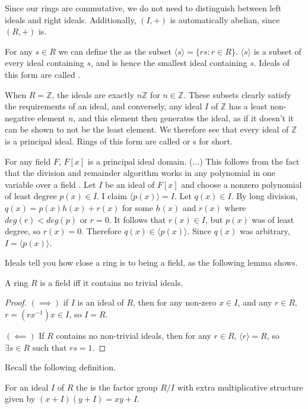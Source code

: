 \begin{remark}
Since our rings are commutative, we do not need to distinguish between left ideals and right ideals. Additionally, $(I,+)$ is automatically abelian, since $(R,+)$ is.
\end{remark}

\begin{example}
For any $s\in R$ we can define the  as the subset $\langle s\rangle =\{rs:r\in R\}$. $\langle s\rangle$ is a subset of every ideal containing $s$, and is hence the smallest ideal containing $s$. Ideals of this form are called .
\end{example}
\begin{example}
When $R=\mathbb{Z}$, the ideals are exactly $n\mathbb{Z}$ for $n\in \mathbb{Z}$. These subsets clearly satisfy the requirements of an ideal, and conversely, any ideal $I$ of $\mathbb{Z}$ has a least non-negative element $n$, and this element then generates the ideal, as if it doesn't it can be shown to not be the least element. We therefore see that every ideal of $\mathbb{Z}$ is a principal ideal. Rings of this form are called  or s for short.
\end{example}
\begin{example}\label{F[x]-PID}
For any field $F$, $F[x]$ is a principal ideal domain. (...) This follows from the fact that the division and remainder algorithm works in any polynomial in one variable over a field \cite{Honours-Algebra}. Let $I$ be an ideal of $F[x]$ and choose a nonzero polynomial of least degree $p(x)\in I$. I claim $\langle p(x)\rangle =I$. Let $q(x)\in I$. By long division, $q(x)=p(x)h(x)+r(x)$ for some $h(x)$ and $r(x)$ where $deg(r)<deg(p)$ or $r=0$. It follows that $r(x)\in I$, but $p(x)$ was of least degree, so $r(x)=0$. Therefore $q(x)\in \langle p(x)\rangle$. Since $q(x)$ was arbitrary, $I=\langle p(x)\rangle$.
\end{example}


Ideals tell you how close a ring is to being a field, as the following lemma shows.
\begin{lemma}\label{field-iff-no-ideals}
A ring $R$ is a field iff it contains no trivial ideals.
\end{lemma}
\begin{proof}
$(\implies)$ if $I$ is an ideal of $R$, then for any non-zero $x\in I$, and any $r\in R$, $r=(rx^{-1})x\in I$, so $I=R$.

$(\impliedby)$ If $R$ contains no non-trivial ideals, then for any $r\in R$, $\langle r\rangle =R$, so $\exists s\in R \text{ such that } rs=1$.
\end{proof}
Recall the following definition.
\begin{definition}
For an ideal $I$ of $R$ the  is the factor group $R/I$ with extra multiplicative structure given by $(x+I)(y+I)=xy+I$.
\end{definition}

